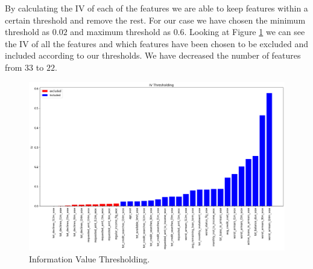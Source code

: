 By calculating the IV of each of the features we are able to keep features within a certain threshold and remove the rest. For our case we have chosen the minimum threshold as $0.02$ and maximum threshold as $0.6$. Looking at Figure \ref{fig-IV-Thresh} we can see the IV of all the features and which features have been chosen to be excluded and included according to our thresholds. We have decreased the number of features from $33$ to $22$.

\begin  {figure}[!htpb]
\centering
  \includegraphics[width=\linewidth]{Credit_Images/IV.png}
   \caption{Information Value Thresholding.}
    \label{fig-IV-Thresh}
\end{figure}

